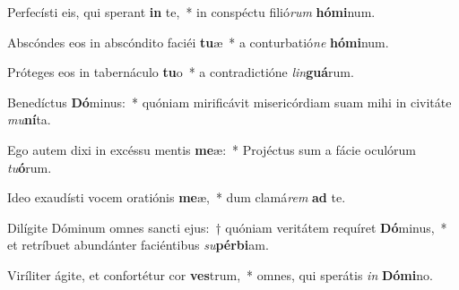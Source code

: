\item Perfecísti eis, qui sperant \textbf{in} te,~* in conspéctu filió\textit{rum} \textbf{hó}\textbf{mi}num.
\item Abscóndes eos in abscóndito faciéi \textbf{tu}æ~* a conturbatió\textit{ne} \textbf{hó}\textbf{mi}num.
\item Próteges eos in tabernáculo \textbf{tu}o~* a contradictióne \textit{lin}\textbf{guá}rum.
\item Benedíctus \textbf{Dó}minus:~* quóniam mirificávit misericórdiam suam mihi in civitáte \textit{mu}\textbf{ní}ta.
\item Ego autem dixi in excéssu mentis \textbf{me}æ:~* Projéctus sum a fácie oculórum \textit{tu}\textbf{ó}rum.
\item Ideo exaudísti vocem oratiónis \textbf{me}æ,~* dum clamá\textit{rem} \textbf{ad} te.
\item Dilígite Dóminum omnes sancti ejus:~† quóniam veritátem requíret \textbf{Dó}minus,~* et retríbuet abundánter faciéntibus \textit{su}\textbf{pér}\textbf{bi}am.
\item Viríliter ágite, et confortétur cor \textbf{ves}trum,~* omnes, qui sperátis \textit{in} \textbf{Dó}\textbf{mi}no.
